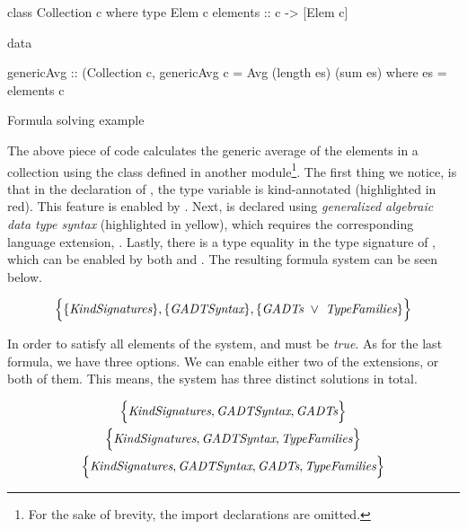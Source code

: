 \documentclass[main.tex]{subfiles}
\begin{document}
	\begin{codeFloat}[H]
		\begin{haskell}
			class Collection c where
			  type Elem c
			  elements :: c -> [Elem c]
		\end{haskell}
		\begin{haskell}
			data %
			
			genericAvg :: (Collection c,  %
			genericAvg c = Avg (length es) (sum es)
			  where es = elements c
		\end{haskell}
		\caption{Formula solving example}
		\label{code:sat-solving}
	\end{codeFloat}
	
	The above piece of code calculates the generic average of the elements in a collection using the  class defined in another module\footnote{For the sake of brevity, the import declarations are omitted.}. The first thing we notice, is that in the declaration of , the type variable  is kind-annotated (highlighted in red). This feature is enabled by . Next,  is declared using \emph{generalized algebraic data type syntax} (highlighted in yellow), which requires the corresponding language extension, . Lastly, there is a type equality in the type signature of , which can be enabled by both  and . The resulting formula system can be seen below.
	
	\begin{align*}
		\Big\{ \{\textit{KindSignatures}\}, \{\textit{GADTSyntax}\}, \{\textit{GADTs}~\lor~\textit{TypeFamilies}\} \Big\}
	\end{align*}
	
	In order to satisfy all elements of the system,  and  must be \emph{true}. As for the last formula, we have three options. We can enable either two of the extensions, or both of them. This means, the system has three distinct solutions in total.
	
	\begin{gather}
		\Big\{ \textit{KindSignatures}, \textit{GADTSyntax}, \textit{GADTs} \Big\} \label{eq:set-GADTs} \\
		\Big\{ \textit{KindSignatures}, \textit{GADTSyntax}, \textit{TypeFamilies} \Big\} \label{eq:set-TypeFamilies} \\
		\Big\{ \textit{KindSignatures}, \textit{GADTSyntax}, \textit{GADTs}, \textit{TypeFamilies} \Big\} \label{eq:set-both}
	\end{gather}
	
\end{document}
